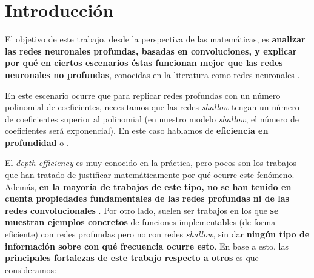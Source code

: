 \chapter{Introducción}\label{ch:introduccion}

El objetivo de este trabajo, desde la perspectiva de las matemáticas, es \textbf{analizar las redes neuronales profundas, basadas en convoluciones, y explicar por qué en ciertos escenarios éstas funcionan mejor que las redes neuronales no profundas}, conocidas en la literatura como redes neuronales .

En este escenario ocurre que para replicar redes profundas con un número polinomial de coeficientes, necesitamos que las redes \textit{shallow} tengan un número de coeficientes superior al polinomial (en nuestro modelo \textit{shallow}, el número de coeficientes será exponencial). En este caso hablamos de \textbf{eficiencia en profundidad} o \textbf{}.

El \textit{depth efficiency} es muy conocido en la práctica, pero pocos son los trabajos que han tratado de justificar matemáticamente por qué ocurre este fenómeno. Además, \textbf{en la mayoría de trabajos de este tipo, no se han tenido en cuenta propiedades fundamentales de las redes profundas ni de las redes convolucionales} \cite{matematicas:paper_depth_malo_01} \cite{matematicas:paper_depth_malo_02} \cite{matematicas:paper_depth_malo_03}. Por otro lado, suelen ser trabajos en los que \textbf{se muestran ejemplos concretos} de funciones implementables (de forma eficiente) con redes profundas pero no con redes \textit{shallow}, sin dar \textbf{ningún tipo de información sobre con qué frecuencia ocurre esto}. En base a esto, las \textbf{principales fortalezas de este trabajo respecto a otros} es que consideramos:

